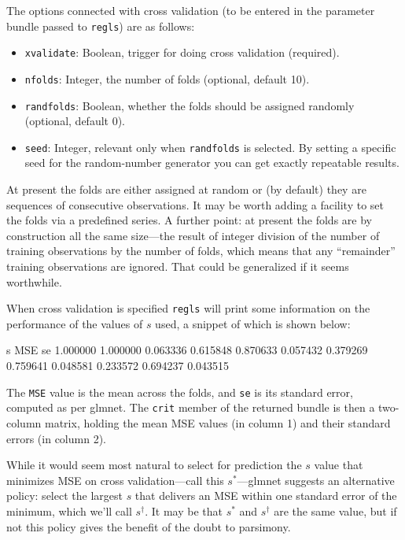 \documentclass{article}
\begin{document}
The options connected with cross validation (to be entered in the
parameter bundle passed to \texttt{regls}) are as follows:
\begin{itemize}
\item \texttt{xvalidate}: Boolean, trigger for doing cross validation (required).
\item \texttt{nfolds}: Integer, the number of folds (optional, default
  10).
\item \texttt{randfolds}: Boolean, whether the folds should be
  assigned randomly (optional, default 0).
\item \texttt{seed}: Integer, relevant only when \texttt{randfolds} is
  selected. By setting a specific seed for the random-number generator
  you can get exactly repeatable results.
\end{itemize}

At present the folds are either assigned at random or (by default)
they are sequences of consecutive observations. It may be worth adding
a facility to set the folds via a predefined series. A further point:
at present the folds are by construction all the same size---the
result of integer division of the number of training observations by
the number of folds, which means that any ``remainder'' training
observations are ignored. That could be generalized if it seems
worthwhile.

When cross validation is specified \texttt{regls} will print some
information on the performance of the values of $s$ used, a
snippet of which is shown below:
\begin{code}
          s        MSE         se
   1.000000   1.000000   0.063336
   0.615848   0.870633   0.057432
   0.379269   0.759641   0.048581
   0.233572   0.694237   0.043515
\end{code}
%
The \texttt{MSE} value is the mean across the folds, and \texttt{se}
is its standard error, computed as per \textsf{glmnet}.  The
\texttt{crit} member of the returned bundle is then a two-column
matrix, holding the mean MSE values (in column 1) and their standard
errors (in column 2).

While it would seem most natural to select for prediction the $s$
value that minimizes MSE on cross validation---call this
$s^*$---\textsf{glmnet} suggests an alternative policy: select the
largest $s$ that delivers an MSE within one standard error of the
minimum, which we'll call $s^{\dagger}$. It may be that $s^*$ and
$s^{\dagger}$ are the same value, but if not this policy gives the
benefit of the doubt to parsimony.
\end{document}
